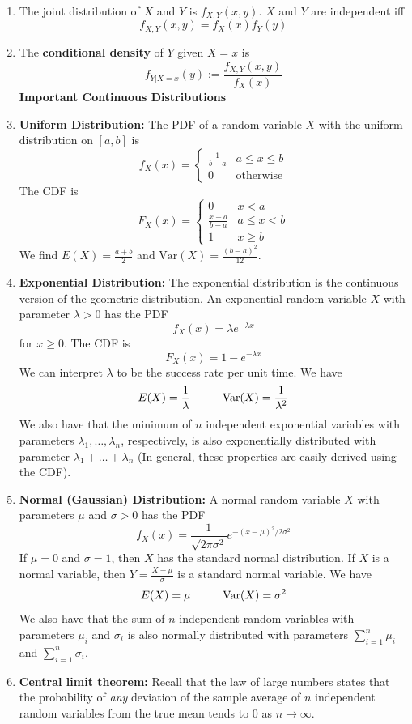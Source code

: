 \documentclass[10pt]{article}
\begin{document}
\begin{multicols}{2}
\begin{enumerate}
\begin{enumerate}
            \item The joint distribution of $X$ and $Y$ is $f_{X,Y}(x,y)$. $X$ and $Y$ are independent iff $$f_{X,Y}(x,y) = f_X(x)f_Y(y)$$
            \item The \textbf{conditional density} of $Y$ given $X=x$ is $$f_{Y|X=x}(y):=\frac{f_{X,Y}(x,y)}{f_X(x)}$$
            \textbf{Important Continuous Distributions}
            \item \textbf{Uniform Distribution:} The PDF of a random variable $X$ with the uniform distribution on $[a,b]$ is
            \[ f_X(x) =
            \begin{cases} 
                  \frac{1}{b-a} & a\leq x \leq b  \\
                  0 & \text{otherwise}
               \end{cases}
            \]
            The CDF is
            \[ F_X(x) =
            \begin{cases} 
                  0 & x < a  \\
                  \frac{x-a}{b-a} & a \leq x < b \\
                  1 & x \geq b
               \end{cases}
            \]
            We find $E(X)=\frac{a+b}{2}$ and $\text{Var}(X)=\frac{(b-a)^2}{12}$.
            \item \textbf{Exponential Distribution:} The exponential distribution is the continuous version of the geometric distribution. An exponential random variable $X$ with parameter $\lambda > 0$ has the PDF
            $$f_X(x) = \lambda e^{-\lambda x}$$ for $x\geq 0$. The CDF is $$F_X(x) = 1 - e^{-\lambda x}$$ We can interpret $\lambda$ to be the success rate per unit time. We have $$E(X) = \frac{1}{\lambda} \hspace{10mm} \text{Var}(X) = \frac{1}{\lambda^2}$$
            We also have that the minimum of $n$ independent exponential variables with parameters $\lambda_1, \ldots, \lambda_n$, respectively, is also exponentially distributed with parameter $\lambda_1+\ldots+\lambda_n$ (In general, these properties are easily derived using the CDF).
            \item \textbf{Normal (Gaussian) Distribution:} A normal random variable $X$ with parameters $\mu$ and $\sigma>0$ has the PDF $$f_X(x) = \frac{1}{\sqrt{2\pi\sigma^2}}e^{-(x-\mu)^2 / 2\sigma^2}$$ If $\mu = 0$ and $\sigma = 1$, then $X$ has the standard normal distribution. If $X$ is a normal variable, then $Y=\frac{X-\mu}{\sigma}$ is a standard normal variable. We have $$E(X) = \mu \hspace{10mm} \text{Var}(X) = \sigma^2$$ We also have that the sum of $n$ independent random variables with parameters $\mu_i$ and $\sigma_i$ is also normally distributed with parameters $\sum_{i=1}^n \mu_i$ and $\sum_{i=1}^n \sigma_i$.
            \item \textbf{Central limit theorem:} Recall that the law of large numbers states that the probability of \textit{any} deviation of the sample average of $n$ independent random variables from the true mean tends to 0 as $n\rightarrow\infty$. \\
            

\end{enumerate}
\end{enumerate}
\end{multicols}
\end{document}
